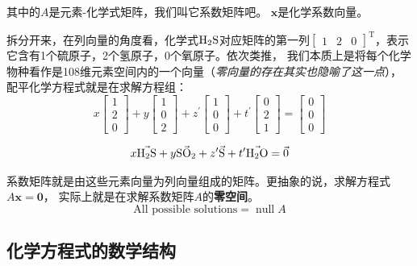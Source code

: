 \documentclass{chem-art}
\DeclareMathOperator{\nullspace}{null}
\newcommand{\x}{\mathbf{x}}
\begin{document}
其中的\(A\)是元素-化学式矩阵，我们叫它系数矩阵吧。 \(\x\)是化学系数向量。

拆分开来，在列向量的角度看，化学式\(\ce{H2S}\)对应矩阵的第一列\(
    \begin{bmatrix}1 & 2 & 0
\end{bmatrix}^{\mathrm{T}}\)，表示它含有1个硫原子，2个氢原子，0个氧原子。依次类推，
我们本质上是将每个化学物种看作是108维元素空间内的一个向量（\textit{零向量的存在其实也隐喻了这一点}），
配平化学方程式就是在求解方程组：
\[
    x
    \begin{bmatrix}1 \\ 2 \\ 0
    \end{bmatrix} + y
    \begin{bmatrix}1 \\ 0 \\ 2
    \end{bmatrix} + z^\prime
    \begin{bmatrix}1 \\ 0 \\ 0
    \end{bmatrix} + t^\prime
    \begin{bmatrix}0 \\ 2 \\ 1
    \end{bmatrix} =
    \begin{bmatrix}0 \\ 0 \\ 0
    \end{bmatrix}
\]

\[
    x \vec{\ce{H2S}} + y \vec{\ce{SO2}} + z^\prime \vec{\ce{S}} +
    t^\prime \vec{\ce{H2O}} = \vec{0}
\]

系数矩阵就是由这些元素向量为列向量组成的矩阵。更抽象的说，求解方程式\(A\x = \mathbf{0}\)，
实际上就是在求解系数矩阵\(A\)的\textbf{零空间}。
\[
    \text{All possible solutions} = \nullspace{A}
\]

\subsection{化学方程式的数学结构}
\end{document}
